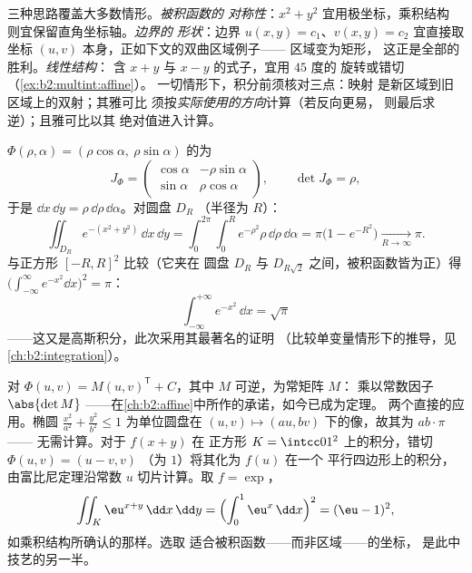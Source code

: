 \begin{remark}[方法：选取变量替换]
三种思路覆盖大多数情形。\emph{被积函数的
对称性}：$x^2 + y^2$ 宜用极坐标，乘积结构
则宜保留直角坐标轴。\emph{边界的
形状}：边界 $u(x,y) = c_1$、$v(x,y) = c_2$ 宜直接取
坐标 $(u, v)$ 本身，正如下文的双曲区域例子——
区域变为矩形，
这正是全部的胜利。\emph{线性结构}：
含 $x + y$ 与 $x - y$ 的式子，宜用 $45$ 度的
旋转或错切（\cref{ex:b2:multint:affine}）。
一切情形下，积分前须核对三点：映射
是新区域到旧区域上的双射；其雅可比
须按\emph{实际使用的方向}计算（若反向更易，
则最后求逆）；且雅可比以其
绝对值进入计算。
\end{remark}

\begin{example}[极坐标]\label{ex:b2:multint:polar}
$\Phi(\rho, \alpha) = (\rho\cos\alpha,\ \rho\sin\alpha)$ 的为
\[
J_\Phi = \begin{pmatrix}
\cos\alpha & -\rho\sin\alpha\\
\sin\alpha & \rho\cos\alpha
\end{pmatrix},
\qquad \det J_\Phi = \rho ,
\]
于是 $\dd x\,\dd y = \rho\,\dd\rho\,\dd\alpha$。对圆盘 $D_R$
（半径为 $R$）：
\[
\iint_{D_R} e^{-(x^2 + y^2)}\,\dd x\,\dd y
= \int_0^{2\pi}\!\!\int_0^R e^{-\rho^2}\rho\,\dd\rho\,\dd\alpha
= \pi\bigl(1 - e^{-R^2}\bigr)
\xrightarrow[R\to\infty]{} \pi .
\]
与正方形 $[-R, R]^2$ 比较（它夹在
圆盘 $D_R$ 与 $D_{R\sqrt2}$ 之间，被积函数皆为正）得
$\bigl(\int_{-\infty}^\infty e^{-x^2}\dd x\bigr)^2 = \pi$：
\[
\boxed{\ \int_{-\infty}^{+\infty} e^{-x^2}\,\dd x = \sqrt{\pi}\ }
\]
——这又是高斯积分，此次采用其最著名的证明
（比较单变量情形下的推导，见
\cref{ch:b2:integration}）。
\end{example}

\begin{example}[仿射变量替换]\label{ex:b2:multint:affine}
对 $\Phi(u, v) = M(u, v)^{\mathsf T} + C$，其中
$M$ 可逆，为常矩阵 $M$：
乘以常数因子 $\abs{\det M}$
——在\cref{ch:b2:affine}中所作的承诺，如今已成为定理。
两个直接的应用。椭圆 $\frac{x^2}{a^2} +
\frac{y^2}{b^2} \leq 1$ 为单位圆盘在
$(u, v) \mapsto (au, bv)$ 下的像，故其为 $ab \cdot \pi$——
无需计算。对于 $f(x + y)$ 在
正方形 $K = \intcc01^2$ 上的积分，错切 $\Phi(u, v) = (u - v, v)$
（为 $1$）将其化为 $f(u)$ 在一个
平行四边形上的积分，由富比尼定理沿常数 $u$ 切片计算。取 $f =
\exp$，
\[
\iint_K \eu^{x+y}\,\dd x\,\dd y
= \Bigl(\int_0^1 \eu^x\,\dd x\Bigr)^2 = (\eu - 1)^2,
\]
如乘积结构所确认的那样。选取
适合被积函数——而非区域——的坐标，
是此中技艺的另一半。
\end{example}


